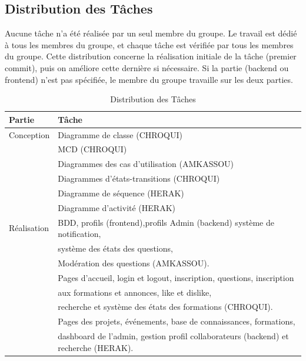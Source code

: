 \documentclass{article}
\begin{document}
        \subsection{Distribution des Tâches}
            Aucune tâche n'a été réalisée par un seul membre du groupe. Le travail est dédié à tous les membres du groupe, et chaque tâche est vérifiée par tous les membres du groupe. Cette distribution concerne la réalisation initiale de la tâche (premier commit), puis on améliore cette dernière si nécessaire. \newline
            Si la partie (backend ou frontend) n'est pas spécifiée, le membre du groupe travaille sur les deux parties. \newline
            \begin{table}[!ht]
                \centering
                \begin{tabular}{|l|l|}
                    \hline
                    Partie &
                    Tâche \\
                    \hline
                    Conception  &
                    Diagramme de classe (CHROQUI) \\
                                &
                    MCD (CHROQUI) \\
                                &
                    Diagrammes des cas d'utilisation (AMKASSOU) \\
                                &
                    Diagrammes d'états-transitions (CHROQUI) \\
                                &
                    Diagramme de séquence (HERAK) \\
                                &
                    Diagramme d'activité (HERAK) \\
                    \hline
                    Réalisation &
                    BDD, profils (frontend),profils Admin (backend) système de notification, \\
                                &
                    système des états des questions, \\
                                &
                    Modération des questions (AMKASSOU). \\
                                &
                    Pages d'accueil, login et logout, inscription, questions, inscription \\
                                &
                    aux formations et annonces, like et dislike, \\
                                &
                    recherche et système des états des formations (CHROQUI). \\
                                &
                    Pages des projets, événements, base de connaissances, formations, \\
                                &
                    dashboard de l'admin, gestion profil collaborateurs (backend) et recherche (HERAK). \\
                    \hline
                \end{tabular}
                \caption{Distribution des Tâches}
            \end{table}
            \FloatBarrier
\end{document}
